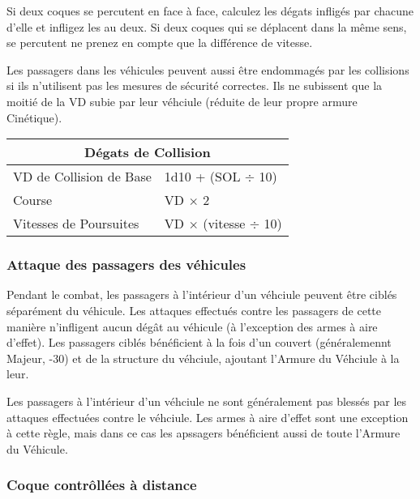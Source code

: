 Si deux coques se percutent en face à face, calculez les dégats infligés par chacune d'elle et infligez les au deux. Si deux coques qui se déplacent dans la même sens, se percutent ne prenez en compte que la différence de vitesse. 

Les passagers dans les véhicules peuvent aussi être endommagés par les collisions si ils n'utilisent pas les mesures de sécurité correctes. Ils ne subissent que la moitié de la VD subie par leur véhciule (réduite de leur propre armure Cinétique). 

\begin{table} \begin{tabular}{|l|l|} \hline

\multicolumn{2}{|c|}{\textbf{Dégats de Collision}}	\\ \hline

VD de Collision de Base	&1d10 + (SOL $\div$ 10)	\\ \hline

Course	&VD $\times$ 2	\\ \hline

Vitesses de Poursuites	&VD $\times$ (vitesse $\div$ 10)	\\ \hline

\end{tabular} \label{tab:collision-damage} \end{table} 

\subsubsection{Attaque des passagers des véhicules} 

Pendant le combat, les passagers à l'intérieur d'un véhciule peuvent être ciblés séparément du véhicule. Les attaques effectués contre les passagers de cette manière n'infligent aucun dégât au véhicule (à l'exception des armes à aire d'effet). Les passagers ciblés bénéficient à la fois d'un couvert (généralemennt Majeur, -30) et de la structure du véhciule, ajoutant l'Armure du Véhciule à la leur. 

Les passagers à l'intérieur d'un véhciule ne sont généralement pas blessés par les attaques effectuées contre le véhciule. Les armes à aire d'effet sont une exception à cette règle, mais dans ce cas les apssagers bénéficient aussi de toute l'Armure du Véhicule. 

\subsubsection{Coque contrôllées à distance} 

